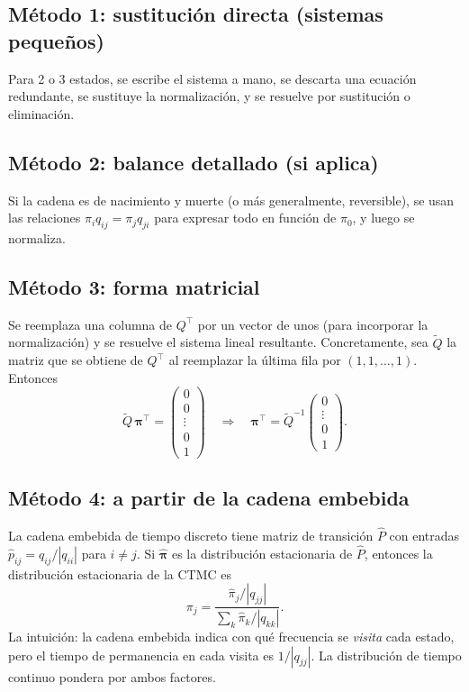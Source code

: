 \documentclass[11pt,a4paper]{article}
\theoremstyle{definition}
\theoremstyle{remark}
\begin{document}
\subsection{Método 1: sustitución directa (sistemas pequeños)}

Para 2 o 3 estados, se escribe el sistema a mano, se descarta una
ecuación redundante, se sustituye la normalización, y se resuelve
por sustitución o eliminación.

\subsection{Método 2: balance detallado (si aplica)}

Si la cadena es de nacimiento y muerte (o más generalmente, reversible),
se usan las relaciones $\pi_i q_{ij} = \pi_j q_{ji}$ para expresar
todo en función de $\pi_0$, y luego se normaliza.

\subsection{Método 3: forma matricial}

Se reemplaza una columna de $Q^\top$ por un vector de unos (para
incorporar la normalización) y se resuelve el sistema lineal resultante.
Concretamente, sea $\tilde{Q}$ la matriz que se obtiene de $Q^\top$ al
reemplazar la última fila por $(1,1,\dots,1)$.  Entonces
\[
  \tilde{Q}\,\boldsymbol{\pi}^\top = \begin{pmatrix}0\\0\\\vdots\\0\\1\end{pmatrix}
  \quad\Longrightarrow\quad
  \boldsymbol{\pi}^\top = \tilde{Q}^{-1}\begin{pmatrix}0\\\vdots\\0\\1\end{pmatrix}.
\]

\subsection{Método 4: a partir de la cadena embebida}

La cadena embebida de tiempo discreto tiene matriz de transición
$\hat{P}$ con entradas $\hat{p}_{ij} = q_{ij}/|q_{ii}|$ para $i\ne j$.
Si $\hat{\boldsymbol{\pi}}$ es la distribución estacionaria de
$\hat{P}$, entonces la distribución estacionaria de la CTMC es
\[
  \pi_j = \frac{\hat{\pi}_j / |q_{jj}|}
               {\sum_k \hat{\pi}_k / |q_{kk}|}.
\]
La intuición: la cadena embebida indica con qué frecuencia se
\emph{visita} cada estado, pero el tiempo de permanencia en cada visita
es $1/|q_{jj}|$.  La distribución de tiempo continuo pondera por ambos
factores.
\end{document}
